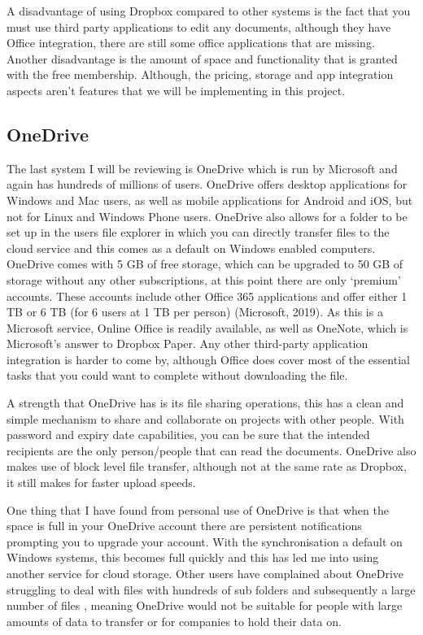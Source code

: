 \documentclass[11pt]{article}
\begin{document}
A disadvantage of using Dropbox compared to other systems is the fact that you must use third party applications to edit any documents, although they have Office integration, there are still some office applications that are missing. Another disadvantage is the amount of space and functionality that is granted with the free membership. Although, the pricing, storage and app integration aspects aren’t features that we will be implementing in this project. 

\subsection{OneDrive}

The last system I will be reviewing is OneDrive which is run by Microsoft and again has hundreds of millions of users. OneDrive offers desktop applications for Windows and Mac users, as well as mobile applications for Android and iOS, but not for Linux and Windows Phone users. OneDrive also allows for a folder to be set up in the users file explorer in which you can directly transfer files to the cloud service and this comes as a default on Windows enabled computers. OneDrive comes with 5 GB of free storage, which can be upgraded to 50 GB of storage without any other subscriptions, at this point there are only ‘premium’ accounts. These accounts include other Office 365 applications and offer either 1 TB or 6 TB (for 6 users at 1 TB per person) (Microsoft, 2019). As this is a Microsoft service, Online Office is readily available, as well as OneNote, which is Microsoft’s answer to Dropbox Paper. Any other third-party application integration is harder to come by, although Office does cover most of the essential tasks that you could want to complete without downloading the file. 

A strength that OneDrive has is its file sharing operations, this has a clean and simple mechanism to share and collaborate on projects with other people. With password and expiry date capabilities, you can be sure that the intended recipients are the only person/people that can read the documents. OneDrive also makes use of block level file transfer, although not at the same rate as Dropbox, it still makes for faster upload speeds.

One thing that I have found from personal use of OneDrive is that when the space is full in your OneDrive account there are persistent notifications prompting you to upgrade your account. With the synchronisation a default on Windows systems, this becomes full quickly and this has led me into using another service for cloud storage. Other users have complained about OneDrive struggling to deal with files with hundreds of sub folders and subsequently a large number of files , meaning OneDrive would not be suitable for people with large amounts of data to transfer or for companies to hold their data on.
\end{document}
